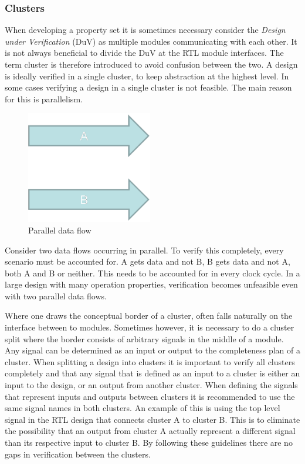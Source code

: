 \subsubsection{Clusters}
\label{subsub:clust}
When developing a property set it is sometimes necessary consider the \textit{Design under Verification} (DuV) as multiple modules communicating with each other. It is not always beneficial to divide the DuV at the RTL module interfaces. The term cluster is therefore introduced to avoid confusion between the two. A design is ideally verified in a single cluster, to keep abstraction at the highest level. In some cases verifying a design in a single cluster is not feasible. The main reason for this is parallelism.\\ 
\begin{figure}
\includegraphics[width=5.5cm]{figs/Verif/parallell.png}
\caption{Parallel data flow}\label{fig:para}
\end{figure} 

Consider two data flows occurring in parallel. To verify this completely, every scenario must be accounted for. A gets data and not B, B gets data and not A, both A and B or neither. This needs to be accounted for in every clock cycle. In a large design with many operation properties, verification becomes unfeasible even with two parallel data flows.     


Where one draws the conceptual border of a cluster, often falls naturally on the interface between to modules. Sometimes however, it is necessary to do a cluster split where the border consists of arbitrary signals in the middle of a module. Any signal can be determined as an input or output to the completeness plan of a cluster\cite{clust}. When splitting a design into clusters it is important to verify all clusters completely and that any signal that is defined as an input to a cluster is either an input to the design, or an output from another cluster. When defining the signals that represent inputs and outputs between clusters it is recommended to use the same signal names in both clusters. An example of this is using the top level signal in the RTL design that connects cluster A to cluster B. This is to eliminate the possibility that an output from cluster A actually represent a different signal than its respective input to cluster B. By following these guidelines there are no gaps in verification between the clusters. 



